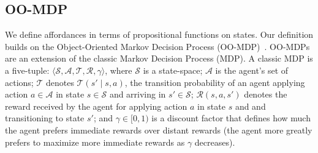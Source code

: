 \documentclass[]{article}
\begin{document}




\subsection{OO-MDP}

We define affordances in terms of propositional functions on states. Our definition builds on the Object-Oriented Markov Decision Process
(OO-MDP)~\citep{diuk08}.  OO-MDPs are an extension of
the classic Markov Decision Process (MDP).  A classic MDP is a
five-tuple: $\langle \mathcal{S}, \mathcal{A}, \mathcal{T},
\mathcal{R}, \gamma \rangle$, where $\mathcal{S}$ is a state-space;
$\mathcal{A}$ is the agent's set of actions; $\mathcal{T}$ denotes
$\mathcal{T}(s' \mid s,a)$, the transition probability of an agent
applying action $a \in \mathcal{A}$ in state $s \in \mathcal{S}$ and
arriving in $s' \in \mathcal{S}$; $\mathcal{R}(s,a,s')$ denotes the
reward received by the agent for applying action $a$ in state $s$ and
and transitioning to state $s'$; and $\gamma \in [0, 1)$ is a discount
  factor that defines how much the agent prefers immediate rewards
  over distant rewards (the agent more greatly prefers to maximize
  more immediate rewards as $\gamma$ decreases).
\end{document}
